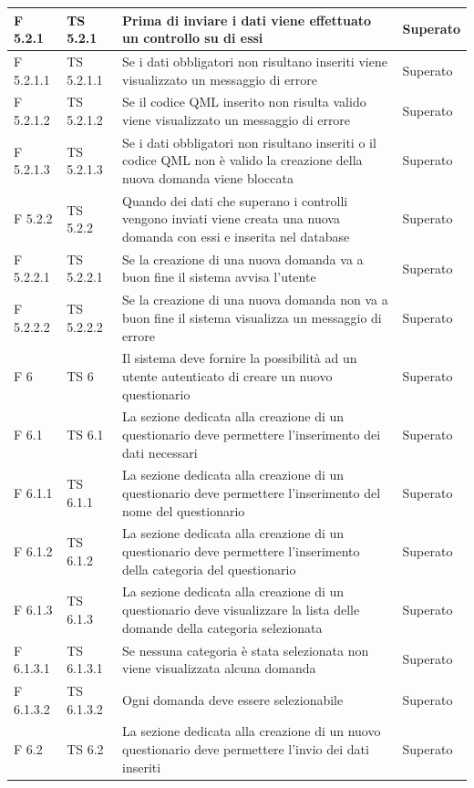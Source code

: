 \documentclass[a4paper,11pt]{article}
\begin{document}
\begin{longtable}{p{}p{}p{}p{}}
\midrule
F 5.2.1 & TS 5.2.1&Prima di inviare i dati viene effettuato un controllo su di essi & Superato\\
\midrule
F 5.2.1.1 & TS 5.2.1.1 &Se i dati obbligatori non risultano inseriti viene visualizzato un messaggio di errore & Superato\\
\midrule
F 5.2.1.2 & TS 5.2.1.2 &Se il codice QML inserito non risulta valido viene visualizzato un messaggio di errore & Superato\\
\midrule
F 5.2.1.3 &TS 5.2.1.3 &Se i dati obbligatori non risultano inseriti o il codice QML non è valido la creazione della nuova domanda viene bloccata & Superato\\
\midrule
F 5.2.2 & TS 5.2.2 &Quando dei dati che superano i controlli vengono inviati viene creata una nuova domanda con essi e inserita nel database & Superato\\
\midrule
F 5.2.2.1 & TS 5.2.2.1 &Se la creazione di una nuova domanda va a buon fine il sistema avvisa l'utente & Superato\\
\midrule
F 5.2.2.2 & TS 5.2.2.2 & Se la creazione di una nuova domanda non va a buon fine il sistema visualizza un messaggio di errore & Superato\\
\midrule
F 6 & TS 6&Il sistema deve fornire la possibilità ad un utente autenticato di creare un nuovo questionario & Superato\\
\midrule
F 6.1 &TS 6.1&La sezione dedicata alla creazione di un questionario deve permettere l'inserimento dei dati necessari & Superato\\
\midrule
F 6.1.1 & TS 6.1.1&La sezione dedicata alla creazione di un questionario deve permettere l'inserimento del nome del questionario & Superato\\
\midrule
F 6.1.2 &TS 6.1.2 &La sezione dedicata alla creazione di un questionario deve permettere l'inserimento della categoria del questionario & Superato\\
\midrule
F 6.1.3 &TS 6.1.3 &La sezione dedicata alla creazione di un questionario deve visualizzare la lista delle domande della categoria selezionata & Superato\\
\midrule
F 6.1.3.1 &TS 6.1.3.1 &Se nessuna categoria è stata selezionata non viene visualizzata alcuna domanda & Superato\\
\midrule
F 6.1.3.2 & TS 6.1.3.2 &Ogni domanda deve essere selezionabile & Superato\\
\midrule
F 6.2 & TS 6.2 &La sezione dedicata alla creazione di un nuovo questionario deve permettere l'invio dei dati inseriti & Superato\\

\end{longtable}
\end{document}
